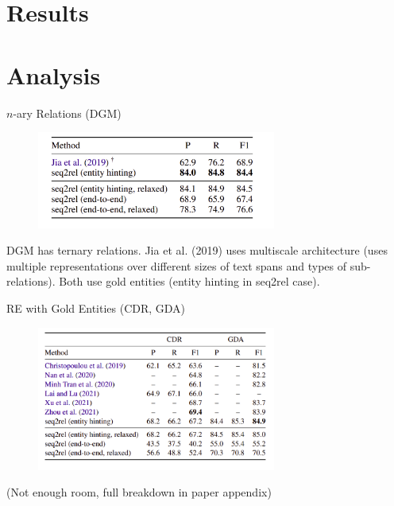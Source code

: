 \documentclass[usenames,dvipsnames,pdf]{beamer}
\begin{document}
        
        
        \section{Results}

        
        
        \section{Analysis}


        \begin{frame}{$n$-ary Relations (DGM)}
          \begin{figure}
            \includegraphics[width=0.7\textwidth,height=0.7\textheight,keepaspectratio]{DGM_n_ary_comparison} 
          \end{figure}
          DGM has ternary relations. Jia et al. (2019) uses multiscale architecture
          (uses multiple representations over different sizes of text spans and types of sub-relations).
          Both use gold entities (entity hinting in seq2rel case).
        \end{frame}

        \begin{frame}{RE with Gold Entities (CDR, GDA)}
          \begin{figure}
            \includegraphics[width=0.7\textwidth,height=0.7\textheight,keepaspectratio]{CDR_GDA_gold_entities} 
          \end{figure}

          (Not enough room, full breakdown in paper appendix)
        \end{frame}
\end{document}

